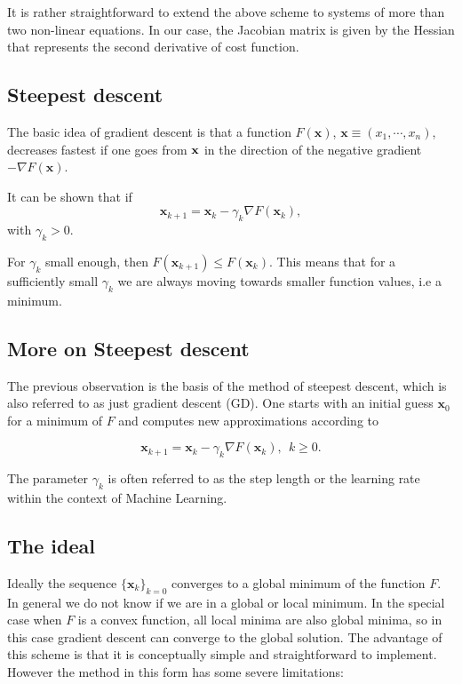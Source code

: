 \documentclass[%
oneside,                 %
final,                   %
10pt]{article}
\begin{document}
It is rather straightforward to extend the above scheme to systems of
more than two non-linear equations. In our case, the Jacobian matrix is given by the Hessian that represents the second derivative of cost function. 

\subsection*{Steepest descent}

The basic idea of gradient descent is
that a function $F(\mathbf{x})$, 
$\mathbf{x} \equiv (x_1,\cdots,x_n)$, decreases fastest if one goes from $\bf {x}$ in the
direction of the negative gradient $-\nabla F(\mathbf{x})$.

It can be shown that if 
\[
\mathbf{x}_{k+1} = \mathbf{x}_k - \gamma_k \nabla F(\mathbf{x}_k),
\]
with $\gamma_k > 0$.

For $\gamma_k$ small enough, then $F(\mathbf{x}_{k+1}) \leq
F(\mathbf{x}_k)$. This means that for a sufficiently small $\gamma_k$
we are always moving towards smaller function values, i.e a minimum.

\subsection*{More on Steepest descent}

The previous observation is the basis of the method of steepest
descent, which is also referred to as just gradient descent (GD). One
starts with an initial guess $\mathbf{x}_0$ for a minimum of $F$ and
computes new approximations according to

\[
\mathbf{x}_{k+1} = \mathbf{x}_k - \gamma_k \nabla F(\mathbf{x}_k), \ \ k \geq 0.
\]

The parameter $\gamma_k$ is often referred to as the step length or
the learning rate within the context of Machine Learning.

\subsection*{The ideal}

Ideally the sequence $\{\mathbf{x}_k \}_{k=0}$ converges to a global
minimum of the function $F$. In general we do not know if we are in a
global or local minimum. In the special case when $F$ is a convex
function, all local minima are also global minima, so in this case
gradient descent can converge to the global solution. The advantage of
this scheme is that it is conceptually simple and straightforward to
implement. However the method in this form has some severe
limitations:
\end{document}
